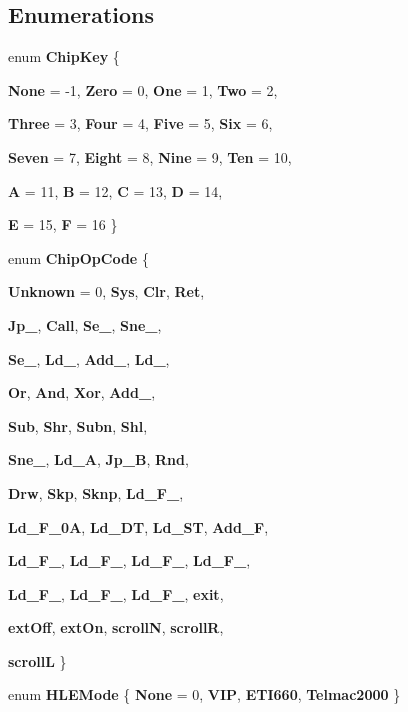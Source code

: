 \subsection*{Enumerations}
\begin{DoxyCompactItemize}
\item 
enum {\bfseries ChipKey} \{ \par
{\bfseries None} =  -\/1, 
{\bfseries Zero} =  0, 
{\bfseries One} =  1, 
{\bfseries Two} =  2, 
\par
{\bfseries Three} =  3, 
{\bfseries Four} =  4, 
{\bfseries Five} =  5, 
{\bfseries Six} =  6, 
\par
{\bfseries Seven} =  7, 
{\bfseries Eight} =  8, 
{\bfseries Nine} =  9, 
{\bfseries Ten} =  10, 
\par
{\bfseries A} =  11, 
{\bfseries B} =  12, 
{\bfseries C} =  13, 
{\bfseries D} =  14, 
\par
{\bfseries E} =  15, 
{\bfseries F} =  16
 \}
\item 
enum {\bfseries ChipOpCode} \{ \par
{\bfseries Unknown} =  0, 
{\bfseries Sys}, 
{\bfseries Clr}, 
{\bfseries Ret}, 
\par
{\bfseries Jp\_}, 
{\bfseries Call}, 
{\bfseries Se\_}, 
{\bfseries Sne\_}, 
\par
{\bfseries Se\_}, 
{\bfseries Ld\_}, 
{\bfseries Add\_}, 
{\bfseries Ld\_}, 
\par
{\bfseries Or}, 
{\bfseries And}, 
{\bfseries Xor}, 
{\bfseries Add\_}, 
\par
{\bfseries Sub}, 
{\bfseries Shr}, 
{\bfseries Subn}, 
{\bfseries Shl}, 
\par
{\bfseries Sne\_}, 
{\bfseries Ld\_\-A}, 
{\bfseries Jp\_\-B}, 
{\bfseries Rnd}, 
\par
{\bfseries Drw}, 
{\bfseries Skp}, 
{\bfseries Sknp}, 
{\bfseries Ld\_\-F\_}, 
\par
{\bfseries Ld\_\-F\_\-0A}, 
{\bfseries Ld\_\-DT}, 
{\bfseries Ld\_\-ST}, 
{\bfseries Add\_\-F}, 
\par
{\bfseries Ld\_\-F\_}, 
{\bfseries Ld\_\-F\_}, 
{\bfseries Ld\_\-F\_}, 
{\bfseries Ld\_\-F\_}, 
\par
{\bfseries Ld\_\-F\_}, 
{\bfseries Ld\_\-F\_}, 
{\bfseries Ld\_\-F\_}, 
{\bfseries exit}, 
\par
{\bfseries extOff}, 
{\bfseries extOn}, 
{\bfseries scrollN}, 
{\bfseries scrollR}, 
\par
{\bfseries scrollL}
 \}
\item 
enum {\bfseries HLEMode} \{ {\bfseries None} =  0, 
{\bfseries VIP}, 
{\bfseries ETI660}, 
{\bfseries Telmac2000}
 \}
\end{DoxyCompactItemize}
